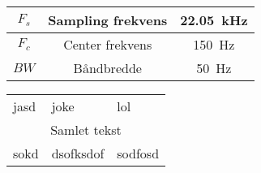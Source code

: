 \begin{center}
\begin{tabular}{| c | c | c |}
\hline
$F_s$ & Sampling frekvens & \SI{22.05}{\kilo\hertz}\tabularnewline
\hline
$F_c$ & Center frekvens & \SI{150}{\hertz}\tabularnewline
\hline
$BW$ & Båndbredde & \SI{50}{\hertz}\tabularnewline
\hline
\end{tabular}
\end{center}

\begin{center}
\begin{tabular}{||m{1cm}|m{1cm}|m{1cm}||}
\hline
    jasd & joke & lol\tabularnewline
    \multicolumn{3}{c}{Samlet tekst}\tabularnewline
    sokd & dsofksdof & sodfosd\tabularnewline
\hline
\end{tabular}
\end{center}








